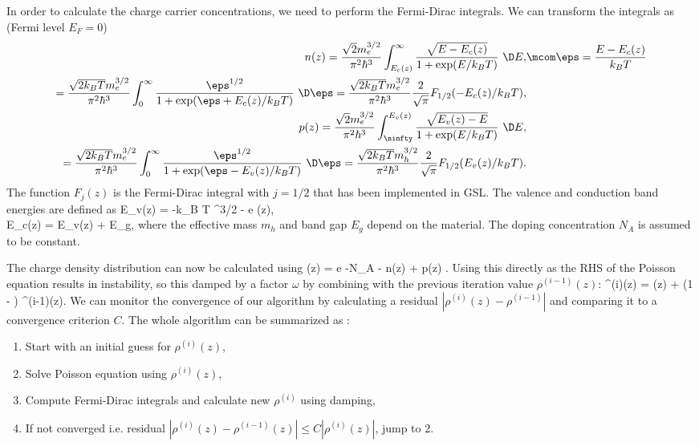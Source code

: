 \documentclass[10pt]{article}
\begin{document}
In order to calculate the charge carrier concentrations, we need to perform the Fermi-Dirac integrals. We can transform the integrals as (Fermi level $E_F = 0$) \cite{kim}
\begin{align}
n(z) = \frac{\sqrt{2} m_e^{3/2}}{\pi^2 \hbar^3} \int_{E_c(z)}^\infty \frac{\sqrt{E - E_c(z)}}{1 + \exp(E / k_B T)} \ \D E, & \mcom \eps = \frac{E - E_c(z)}{k_B T} \nonumber \\
= \frac{\sqrt{2 k_B T} m_e^{3/2}}{\pi^2 \hbar^3} \int_0^\infty \frac{\eps^{1/2}}{1 + \exp(\eps + E_c(z) / k_B T)} \ \D \eps = \frac{\sqrt{2 k_B T} m_e^{3/2}}{\pi^2 \hbar^3} \frac{2}{\sqrt{\pi}} F_{1/2}(-E_c(z) / k_B T), \label{eq:fdn}\\
p(z) = \frac{\sqrt{2} m_e^{3/2}}{\pi^2 \hbar^3} \int_\ninfty^{E_v(z)} \frac{\sqrt{E_v(z) - E}}{1 + \exp(E / k_B T)} \ \D E, \nonumber \\
= \frac{\sqrt{2 k_B T} m_e^{3/2}}{\pi^2 \hbar^3} \int_0^\infty \frac{\eps^{1/2}}{1 + \exp(\eps - E_v(z) / k_B T)} \ \D \eps = \frac{\sqrt{2 k_B T} m_h^{3/2}}{\pi^2 \hbar^3} \frac{2}{\sqrt{\pi}} F_{1/2}(E_v(z) / k_B T). \label{eq:fdp}
\end{align}
The function $F_{j}(z)$ is the Fermi-Dirac integral with $j=1/2$ that has been implemented in GSL. The valence and conduction band energies are defined as \cite{ass}
\bna
E_v(z) = -k_B T \ln \lsb {} \lb {} \rb^{3/2} \rsb - e \phi(z), \\
E_c(z) = E_v(z) + E_g,
\ena
where the effective mass $m_h$ and band gap $E_g$ depend on the material. The doping concentration $N_A$ is assumed to be constant.

The charge density distribution can now be calculated using \cite{ass}
\be
\rho(z) = e \lb -N_A - n(z) + p(z) \rb.
\ee
Using this directly as the RHS of the Poisson equation results in instability, so this damped by a factor $\omega$ by combining with the previous iteration value $\rho^{(i-1)}(z)$:
\bna
\rho^{(i)}(z) = \omega \rho(z) + (1 - \omega) \rho^{(i-1)}(z).
\ena
We can monitor the convergence of our algorithm by calculating a residual $|\rho^{(i)}(z) - \rho^{(i-1)}|$ and comparing it to a convergence criterion $C$. The whole algorithm can be summarized as \cite{ass}:
\begin{enumerate}
\item Start with an initial guess for $\rho^{(i)}(z)$,
\item Solve Poisson equation using $\rho^{(i)}(z)$,
\item Compute Fermi-Dirac integrals and calculate new $\rho^{(i)}$ using damping,
  \item If not converged i.e. residual $|\rho^{(i)}(z) - \rho^{(i-1)}(z)| \leq C |\rho^{(i)}(z)|$, jump to 2.
\end{enumerate}
\end{document}
